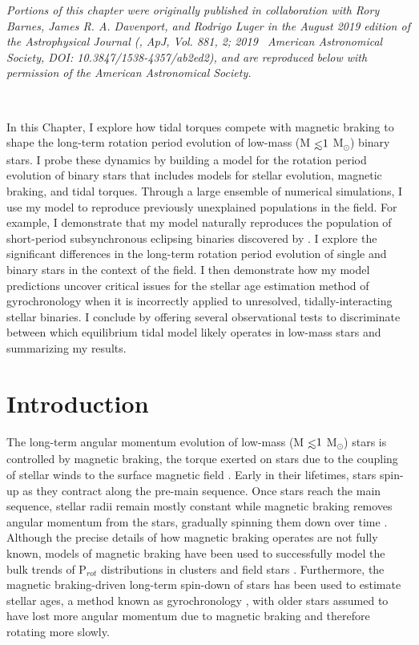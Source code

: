 \textit{Portions of this chapter were originally published in collaboration with Rory Barnes, James R. A. Davenport, and Rodrigo Luger in the August 2019 edition of the Astrophysical Journal (\citet{Fleming2019}, ApJ, Vol. 881, 2; 2019 \textcopyright \ American Astronomical Society, DOI: 10.3847/1538-4357/ab2ed2), and are reproduced below with permission of the American Astronomical Society.}

\

In this Chapter, I explore how tidal torques compete with magnetic braking to shape the long-term rotation period evolution of low-mass (M$\lsim 1$ M$_{\odot}$) binary stars. I probe these dynamics by building a model for the rotation period evolution of binary stars that includes models for stellar evolution, magnetic braking, and tidal torques. Through a large ensemble of numerical simulations, I use my model to reproduce previously unexplained populations in the \kepler field. For example, I demonstrate that my model naturally reproduces the population of short-period subsynchronous \kepler eclipsing binaries discovered by \citet{Lurie2017}. I explore the significant differences in the long-term rotation period evolution of single and binary stars in the context of the \kepler field. I then demonstrate how my model predictions uncover critical issues for the stellar age estimation method of gyrochronology when it is incorrectly applied to unresolved, tidally-interacting stellar binaries. I conclude by offering several observational tests to discriminate between which equilibrium tidal model likely operates in low-mass stars and summarizing my results.


\section{Introduction} \label{sync:sec:intro}

The long-term angular momentum evolution of low-mass (M$\lsim 1$ M$_{\odot}$) stars is controlled by magnetic braking, the torque exerted on stars due to the coupling of stellar winds to the surface magnetic field \citep{Mestel1968}. Early in their lifetimes, stars spin-up as they contract along the pre-main sequence.  Once stars reach the main sequence, stellar radii remain mostly constant while magnetic braking removes angular momentum from the stars, gradually spinning them down over time \citep{Skumanich1972}. Although the precise details of how magnetic braking operates are not fully known, models of magnetic braking have been used to successfully model the bulk trends of P$_{rot}$ distributions in clusters \citep[e.g. Praesepe, ][]{Reiners2012,Matt2015,Douglas2017} and field stars \citep[e.g. the \kepler field, ][]{Matt2015,vanSaders2018}. Furthermore, the magnetic braking-driven long-term spin-down of stars has been used to estimate stellar ages, a method known as gyrochronology \citep{Skumanich1972,Barnes2003,Barnes2007,Mamajek2008,Barnes2010}, with older stars assumed to have lost more angular momentum due to magnetic braking and therefore rotating more slowly.

